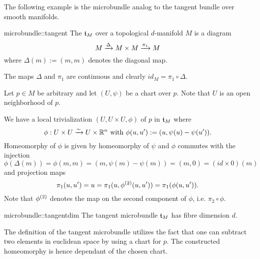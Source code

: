 \begin{myparagraph}
    The following example is the microbundle analog
    to the tangent bundle over smooth manifolds.
\end{myparagraph}

\begin{myexample}{microbundle::tangent}{}
    The  $\mathfrak{t}_M$ over a topological $d$-manifold $M$ is a diagram
    \[ M \xrightarrow{\Delta} M \times M \xrightarrow{\pi_1} M{} \]
    where $\Delta(m) := (m, m)$ denotes the diagonal map.
\end{myexample}

\begin{myproof}
    The maps $\Delta$ and $\pi_1$ are continuous and clearly $id_M = \pi_1 \circ \Delta$.

    Let $p \in M$ be arbitrary and let $(U, \psi)$ be a chart over $p$.
    Note that $U$ is an open neighborhood of $p$.
    
    We have a local trivialization $(U, U \times U, \phi)$ of $p$ in $\mathfrak{t}_M$ where
    \[ \phi: U \times U \xrightarrow{\sim} U \times \mathbb{R}^n \text{ with } \phi(u, u') := (u, \psi(u) - \psi(u')). \]
    Homeomorphy of $\phi$ is given by homeomorphy of $\psi$
    and $\phi$ commutes with the injection
    \[ \phi(\Delta(m)) = \phi(m, m) = (m, \psi(m) - \psi(m)) = (m, 0) = (id \times 0)(m)\]
    and projection maps
    \[ \pi_1(u, u') = u = \pi_1(u, \phi^{(2)}(u, u')) = \pi_1(\phi(u, u')). \]
    Note that $\phi^{(2)}$ denotes the map on the second component of $\phi$,
    i.e. $\pi_2 \circ \phi$.
\end{myproof}

\begin{myremark}{microbundle::tangentdim}{}
    The tangent microbundle $\mathfrak{t}_M$ has fibre dimension $d$.
\end{myremark}

\begin{myparagraph}
    The definition of the tangent microbundle
    utilizes the fact that one can subtract two elements in euclidean space
    by using a chart for $p$.
    The constructed homeomorphy is hence dependant
    of the chosen chart.
\end{myparagraph}